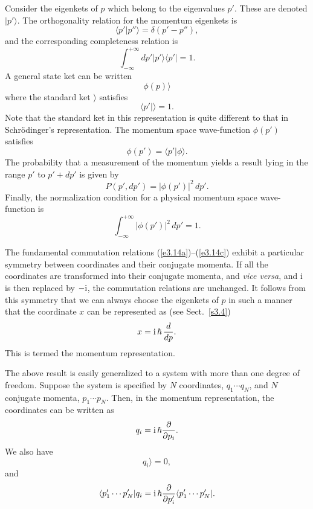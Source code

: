 Consider the eigenkets of $p$ which belong to the eigenvalues $p'$. These are
denoted $|p'\rangle$. The orthogonality relation for the momentum eigenkets is
\begin{equation}\label{e3.69}
\langle p'|p''\rangle = \delta(p'-p''),
\end{equation}
and the corresponding completeness relation is
\begin{equation}\label{e3.70}
\int_{-\infty}^{+\infty} dp' |p'\rangle \langle p'| = 1.
\end{equation}
A general state ket can be written
\begin{equation}
\phi(p)\rangle
\end{equation}
where the standard ket $\rangle $  satisfies 
\begin{equation}
\langle p'| \rangle = 1.
\end{equation}
Note that the standard ket in this representation is quite
different to that  in Schr\"{o}dinger's representation. 
The momentum space wave-function $\phi(p')$ satisfies
\begin{equation}
\phi(p') = \langle p'|\phi \rangle.
\end{equation}
The probability that a measurement of the momentum yields a result
lying  in the range $p'$ to
$p'+dp'$ is given by
\begin{equation}
P(p', dp') = |\phi(p')|^2\,dp'.
\end{equation}
Finally, the normalization condition for a physical momentum space wave-function is
\begin{equation}
\int_{-\infty}^{+\infty} |\phi(p')|^2\,dp' = 1.
\end{equation}

The fundamental commutation relations (\ref{e3.14a})--(\ref{e3.14c}) exhibit a 
particular symmetry between coordinates and their conjugate momenta. If all the
coordinates are transformed into their conjugate momenta, and {\em vice versa}, and
$\rm i$ is  then replaced by $-\rm i$,  the commutation relations are
unchanged. It follows from this symmetry that we can always choose the eigenkets
of $p$ in such a manner that  the coordinate 
$x$ can be represented as (see Sect.~\ref{s3.4})
\begin{equation}
x = {\rm i}\,\hbar\, \frac{d}{dp}.
\end{equation}
This is termed the momentum representation. 

The above result is easily generalized to a system with more than one degree of
freedom. Suppose the system is specified by $N$ coordinates, $q_1\cdots q_N$, and
$N$ conjugate momenta, $p_1\cdots p_N$. Then, in the momentum representation, the
coordinates can be written as 
\begin{equation}
q_i = {\rm i}\,\hbar \frac{\partial}{\partial p_i}.
\end{equation}
We also have
\begin{equation}
q_i \rangle = 0,
\end{equation}
and
\begin{equation}
\langle p_1' \cdots p_N'| q_i = {\rm i}\,\hbar \frac{\partial}{\partial p_i'}
\langle p_1'\cdots p_N'|.
\end{equation}

